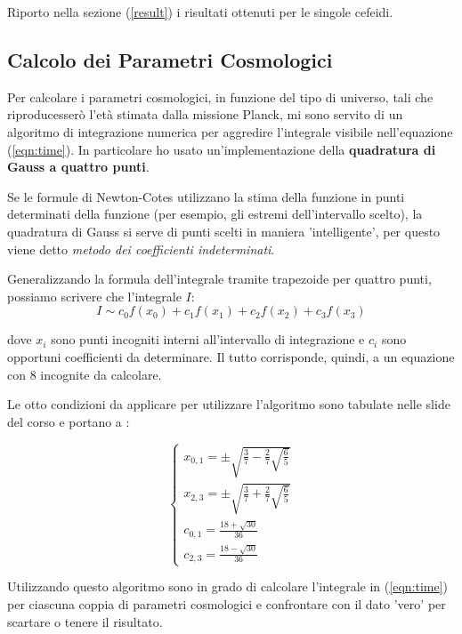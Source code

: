 \documentclass{article}
\begin{document}
Riporto nella sezione (\ref{result}) i risultati ottenuti per le
singole cefeidi.

\subsection{Calcolo dei Parametri Cosmologici}

Per calcolare i parametri cosmologici, in funzione del tipo di
universo, tali che riproducesserò l'età stimata dalla missione Planck,
mi sono servito di un algoritmo di integrazione numerica per aggredire
l'integrale visibile nell'equazione (\ref{eqn:time}). In particolare
ho usato un'implementazione della \textbf{quadratura di Gauss a
  quattro punti}.

Se le formule di Newton-Cotes utilizzano la stima della funzione in
punti determinati della funzione (per esempio, gli estremi
dell'intervallo scelto), la quadratura di Gauss si serve di punti
scelti in maniera 'intelligente', per questo viene detto
\emph{metodo dei coefficienti indeterminati}.

Generalizzando la formula dell'integrale tramite trapezoide per
quattro punti, possiamo
scrivere che l'integrale $I$:
\begin{equation}
  I \sim c_0 f(x_0) + c_1 f(x_1) + c_2 f(x_2) + c_3 f(x_3)
\end{equation}

dove $x_i$ sono punti incogniti interni all'intervallo di
integrazione e $c_i$ sono opportuni coefficienti da
determinare. Il tutto corrisponde, quindi, a un equazione con $8$
incognite da calcolare.

Le otto condizioni da applicare per utilizzare l'algoritmo sono
tabulate nelle slide del corso e portano a :

\begin{equation}
  \begin{cases}
    x_{0,1} = \pm \sqrt{\frac{3}{7} - \frac{2}{7}\sqrt{\frac{6}{5}}}
    \\
    x_{2,3} = \pm \sqrt{\frac{3}{7} + \frac{2}{7}\sqrt{\frac{6}{5}}}
    \\
    c_{0,1}  = \frac{18 + \sqrt{30}}{36}\\
    c_{2,3} = \frac{18 - \sqrt{30}}{36}
    \end{cases}
  \end{equation}

  Utilizzando questo algoritmo sono in grado di calcolare l'integrale
  in (\ref{eqn:time}) per ciascuna coppia di parametri cosmologici e
  confrontare con il dato 'vero' per scartare o tenere il risultato.
\end{document}
